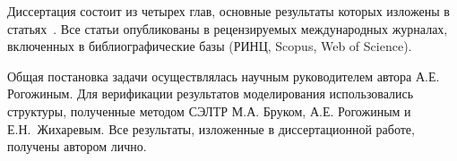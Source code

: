 Диссертация состоит из четырех глав, основные результаты которых изложены в статьях~\cite{my_CO, my_microlenses, my_evidence, my_detailed, my_review_RU, my_MEE, my_Gvalue, my_microscopic, my_Isaev_RU, my_review_2_RU}. Все статьи опубликованы в рецензируемых международных журналах, включенных в библиографические базы (РИНЦ, Scopus, Web of Science).


\contribution
Общая постановка задачи осуществлялась научным руководителем автора \linebreak А.Е. Рогожиным. Для верификации результатов моделирования использовались структуры, полученные методом СЭЛТР М.А. Бруком, А.Е. Рогожиным и Е.Н.~Жихаревым. Все результаты, изложенные в диссертационной работе, получены автором лично.

